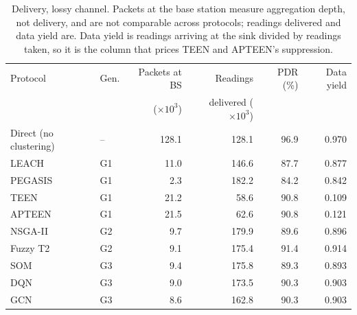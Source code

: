 \begin{table}[!t]
\caption{Delivery, lossy channel. Packets at the base station measure aggregation depth, not delivery, and are not comparable across protocols; readings delivered and data yield are. Data yield is readings arriving at the sink divided by readings taken, so it is the column that prices TEEN and APTEEN's suppression.}
\label{tab:delivery}
\centering
\begin{tabular}{llrrrr}
\toprule
Protocol & Gen. & Packets at BS & Readings & PDR (\%) & Data yield \\
 & & ($\times 10^3$) & delivered ($\times 10^3$) & & \\
\midrule
Direct (no clustering) & -- & 128.1 & 128.1 & 96.9 & 0.970 \\
LEACH & G1 & 11.0 & 146.6 & 87.7 & 0.877 \\
PEGASIS & G1 & 2.3 & 182.2 & 84.2 & 0.842 \\
TEEN & G1 & 21.2 & 58.6 & 90.8 & 0.109 \\
APTEEN & G1 & 21.5 & 62.6 & 90.8 & 0.121 \\
NSGA-II & G2 & 9.7 & 179.9 & 89.6 & 0.896 \\
Fuzzy T2 & G2 & 9.1 & 175.4 & 91.4 & 0.914 \\
SOM & G3 & 9.4 & 175.8 & 89.3 & 0.893 \\
DQN & G3 & 9.0 & 173.5 & 90.3 & 0.903 \\
GCN & G3 & 8.6 & 162.8 & 90.3 & 0.903 \\
\bottomrule
\end{tabular}
\end{table}
